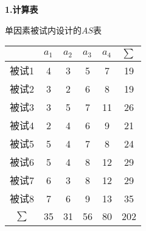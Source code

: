 \textbf{1.计算表}
\begin{margintable}
	\centering
	\caption{单因素被试内设计的$AS$表}
	{
            \begin{tabular}{ccccc|c}
	    \toprule
                & \multicolumn{1}{l}{$a_1$} & \multicolumn{1}{l}{$a_2$} & \multicolumn{1}{l}{$a_3$} & \multicolumn{1}{l}{$a_4$} & \multicolumn{1}{l}{$\sum$} \\
            \midrule
                被试1   & \cellcolor[rgb]{ .949,  .949,  .949}4 & \cellcolor[rgb]{ .949,  .949,  .949}3 & \cellcolor[rgb]{ .949,  .949,  .949}5 & \cellcolor[rgb]{ .949,  .949,  .949}7 & \cellcolor[rgb]{ .988,  .894,  .839}19 \\
                被试2   & \cellcolor[rgb]{ .949,  .949,  .949}3 & \cellcolor[rgb]{ .949,  .949,  .949}2 & \cellcolor[rgb]{ .949,  .949,  .949}6 & \cellcolor[rgb]{ .949,  .949,  .949}8 & \cellcolor[rgb]{ .988,  .894,  .839}19 \\
                被试3   & \cellcolor[rgb]{ .949,  .949,  .949}3 & \cellcolor[rgb]{ .949,  .949,  .949}5 & \cellcolor[rgb]{ .949,  .949,  .949}7 & \cellcolor[rgb]{ .949,  .949,  .949}11 & \cellcolor[rgb]{ .988,  .894,  .839}26 \\
                被试4   & \cellcolor[rgb]{ .949,  .949,  .949}2 & \cellcolor[rgb]{ .949,  .949,  .949}4 & \cellcolor[rgb]{ .949,  .949,  .949}6 & \cellcolor[rgb]{ .949,  .949,  .949}9 & \cellcolor[rgb]{ .988,  .894,  .839}21 \\
                被试5   & \cellcolor[rgb]{ .949,  .949,  .949}5 & \cellcolor[rgb]{ .949,  .949,  .949}4 & \cellcolor[rgb]{ .949,  .949,  .949}7 & \cellcolor[rgb]{ .949,  .949,  .949}8 & \cellcolor[rgb]{ .988,  .894,  .839}24 \\
                被试6   & \cellcolor[rgb]{ .949,  .949,  .949}5 & \cellcolor[rgb]{ .949,  .949,  .949}4 & \cellcolor[rgb]{ .949,  .949,  .949}8 & \cellcolor[rgb]{ .949,  .949,  .949}12 & \cellcolor[rgb]{ .988,  .894,  .839}29 \\
                被试7   & \cellcolor[rgb]{ .949,  .949,  .949}6 & \cellcolor[rgb]{ .949,  .949,  .949}3 & \cellcolor[rgb]{ .949,  .949,  .949}8 & \cellcolor[rgb]{ .949,  .949,  .949}12 & \cellcolor[rgb]{ .988,  .894,  .839}29 \\
                被试8   & \cellcolor[rgb]{ .949,  .949,  .949}7 & \cellcolor[rgb]{ .949,  .949,  .949}6 & \cellcolor[rgb]{ .949,  .949,  .949}9 & \cellcolor[rgb]{ .949,  .949,  .949}13 & \cellcolor[rgb]{ .988,  .894,  .839}35 \\
            \midrule
                $\sum$ & \cellcolor[rgb]{ .886,  .937,  .855}35 & \cellcolor[rgb]{ .886,  .937,  .855}31 & \cellcolor[rgb]{ .886,  .937,  .855}56 & \cellcolor[rgb]{ .886,  .937,  .855}80 & \cellcolor[rgb]{ .867,  .922,  .969}202 \\
            \bottomrule
	    \end{tabular}
	}
\end{margintable}
